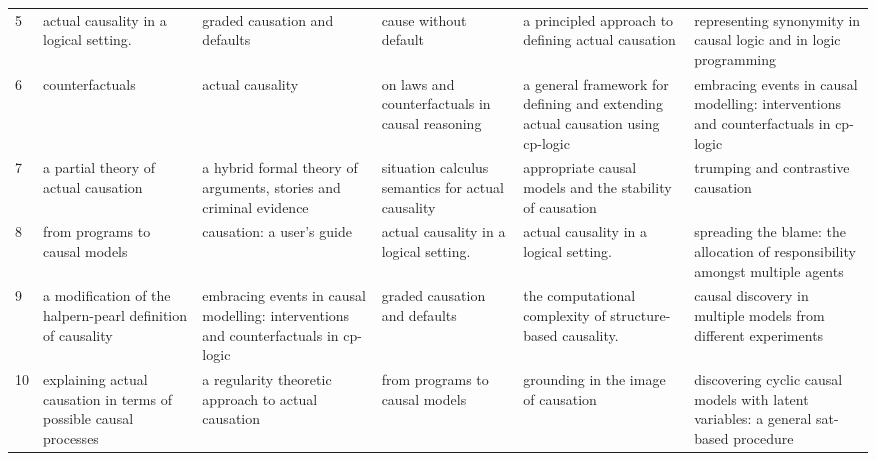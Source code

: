 \documentclass[11pt,a4paper]{book}
\theoremstyle{definition}
\theoremstyle{definition}
\theoremstyle{definition}
\theoremstyle{remark}
\begin{document}
\begin{table}
\begin{tabular}{l p{3.7cm} p{3.7cm}p{3.7cm} p{3.7cm}p{3.7cm} }
5  &                             actual causality in a logical setting. &                                                               graded causation and defaults &                                                      cause without default &                                        a principled approach to defining actual causation &                            representing synonymity in causal logic and in logic programming \\
6  &                                                    counterfactuals &                                                                            actual causality &                            on laws and counterfactuals in causal reasoning &            a general framework for defining and extending actual causation using cp-logic &         embracing events in causal modelling: interventions and counterfactuals in cp-logic \\
7  &                               a partial theory of actual causation &                          a hybrid formal theory of arguments, stories and criminal evidence &                          situation calculus semantics for actual causality &                                  appropriate causal models and the stability of causation &                                                          trumping and contrastive causation \\
8  &                                     from programs to causal models &                                                                   causation: a user's guide &                                     actual causality in a logical setting. &                                                    actual causality in a logical setting. &               spreading the blame: the allocation of responsibility amongst multiple agents \\
9  &        a modification of the halpern-pearl definition of causality &         embracing events in causal modelling: interventions and counterfactuals in cp-logic &                                              graded causation and defaults &                                the computational complexity of structure-based causality. &                              causal discovery in multiple models from different experiments \\
10  &  explaining actual causation in terms of possible causal processes &                                         a regularity theoretic approach to actual causation &                                             from programs to causal models &                                                       grounding in the image of causation &       discovering cyclic causal models with latent variables: a general sat-based procedure \\

\end{tabular}
\end{table}
\end{document}
